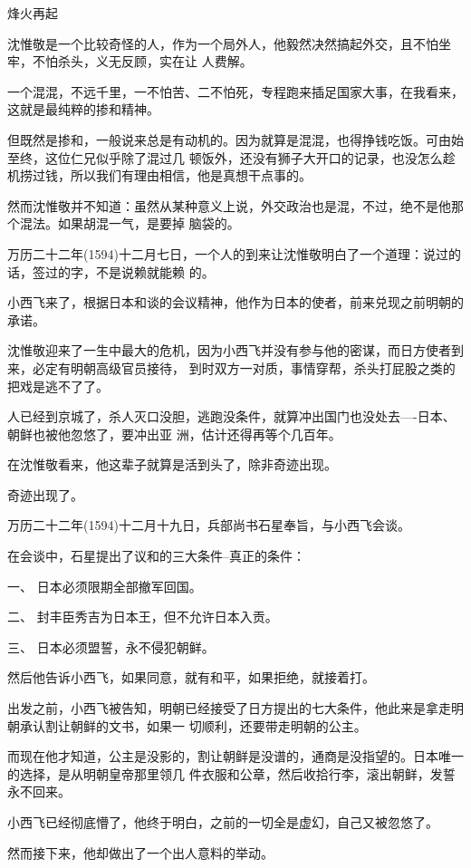 \documentclass[11pt,a4paper,onecolumn]{article}
\begin{document}
烽火再起

沈惟敬是一个比较奇怪的人，作为一个局外人，他毅然决然搞起外交，且不怕坐牢，不怕杀头，义无反顾，实在让
人费解。

一个混混，不远千里，一不怕苦、二不怕死，专程跑来插足国家大事，在我看来，这就是最纯粹的掺和精神。

但既然是掺和，一般说来总是有动机的。因为就算是混混，也得挣钱吃饭。可由始至终，这位仁兄似乎除了混过几
顿饭外，还没有狮子大开口的记录，也没怎么趁机捞过钱，所以我们有理由相信，他是真想干点事的。

然而沈惟敬并不知道：虽然从某种意义上说，外交政治也是混，不过，绝不是他那个混法。如果胡混一气，是要掉
脑袋的。

万历二十二年(1594)十二月七日，一个人的到来让沈惟敬明白了一个道理：说过的话，签过的字，不是说赖就能赖
的。

小西飞来了，根据日本和谈的会议精神，他作为日本的使者，前来兑现之前明朝的承诺。

沈惟敬迎来了一生中最大的危机，因为小西飞并没有参与他的密谋，而日方使者到来，必定有明朝高级官员接待，
到时双方一对质，事情穿帮，杀头打屁股之类的把戏是逃不了了。

人已经到京城了，杀人灭口没胆，逃跑没条件，就算冲出国门也没处去----日本、朝鲜也被他忽悠了，要冲出亚
洲，估计还得再等个几百年。

在沈惟敬看来，他这辈子就算是活到头了，除非奇迹出现。

奇迹出现了。

万历二十二年(1594)十二月十九日，兵部尚书石星奉旨，与小西飞会谈。

在会谈中，石星提出了议和的三大条件--真正的条件：

一、 日本必须限期全部撤军回国。

二、 封丰臣秀吉为日本王，但不允许日本入贡。

三、 日本必须盟誓，永不侵犯朝鲜。

然后他告诉小西飞，如果同意，就有和平，如果拒绝，就接着打。

出发之前，小西飞被告知，明朝已经接受了日方提出的七大条件，他此来是拿走明朝承认割让朝鲜的文书，如果一
切顺利，还要带走明朝的公主。

而现在他才知道，公主是没影的，割让朝鲜是没谱的，通商是没指望的。日本唯一的选择，是从明朝皇帝那里领几
件衣服和公章，然后收拾行李，滚出朝鲜，发誓永不回来。

小西飞已经彻底懵了，他终于明白，之前的一切全是虚幻，自己又被忽悠了。

然而接下来，他却做出了一个出人意料的举动。

\section[\thesection]{}
\end{document}

